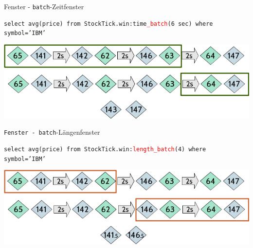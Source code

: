 \documentclass{beamer}
\begin{document}
\begin{frame}{Fenster - \texttt{batch}-Zeitfenster}
\begin{exampleblock}{}
    \begin{center}
        \texttt{select  avg(price) from StockTick.win:time\textcolor{red}{\_batch}(6 sec) 
        where symbol='IBM'}
    \end{center}
\end{exampleblock}
\vspace{1cm}
\begin{center}
    \includegraphics[scale=0.5]{img/solution-4}
\end{center}
\end{frame}
\begin{frame}{\texttt{Fenster - batch}-Längenfenster}
\begin{exampleblock}{}
    \begin{center}
        \texttt{select  avg(price) from 
        StockTick.win:\textcolor{red}{length\_batch}(4) where symbol='IBM'}
    \end{center}
\end{exampleblock}
\vspace{1cm}
\begin{center}
    \includegraphics[scale=0.5]{img/solution-5}
\end{center}

\end{frame}
\end{document}
